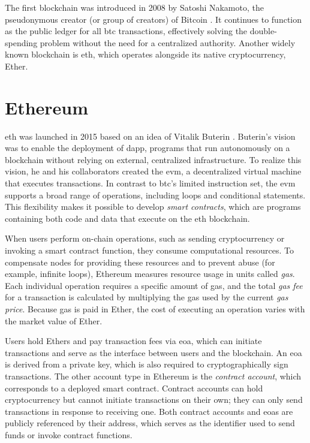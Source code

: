The first blockchain was introduced in 2008 by Satoshi Nakamoto, the pseudonymous creator (or group of creators) of Bitcoin \cite{nakamoto2008bitcoin}. It continues to function as the public ledger for all \acrlong{btc} transactions, effectively solving the \gls{double-spending} problem without the need for a centralized authority. Another widely known blockchain is \acrfull{eth}, which operates alongside its native cryptocurrency, Ether.

\section{Ethereum}
\acrlong{eth} was launched in 2015 based on an idea of Vitalik Buterin \cite{buterin2014next}\cite{wood2014ethereum}. Buterin's vision was to enable the deployment of \acrfull{dapp}, programs that run autonomously on a blockchain without relying on external, centralized infrastructure. To realize this vision, he and his collaborators created the \acrfull{evm}, a decentralized virtual machine that executes transactions. In contrast to \acrlong{btc}'s limited instruction set, the \acrshort{evm} supports a broad range of operations, including loops and conditional statements. This flexibility makes it possible to develop \textit{smart contracts}, which are programs containing both code and data that execute on the \acrlong{eth} blockchain.

When users perform on-chain operations, such as sending cryptocurrency or invoking a smart contract function, they consume computational resources. To compensate nodes for providing these resources and to prevent abuse (for example, infinite loops), Ethereum measures resource usage in units called \textit{gas}. Each individual operation requires a specific amount of gas, and the total \textit{gas fee} for a transaction is calculated by multiplying the gas used by the current \textit{gas price}. Because gas is paid in Ether, the cost of executing an operation varies with the market value of Ether.

Users hold Ethers and pay transaction fees via \acrfull{eoa}, which can initiate transactions and serve as the interface between users and the blockchain. An \acrshort{eoa} is derived from a private key, which is also required to cryptographically sign transactions. The other account type in Ethereum is the \textit{contract account}, which corresponds to a deployed smart contract. Contract accounts can hold cryptocurrency but cannot initiate transactions on their own; they can only send transactions in response to receiving one. Both contract accounts and \acrshort{eoa}s are publicly referenced by their address, which serves as the identifier used to send funds or invoke contract functions.

